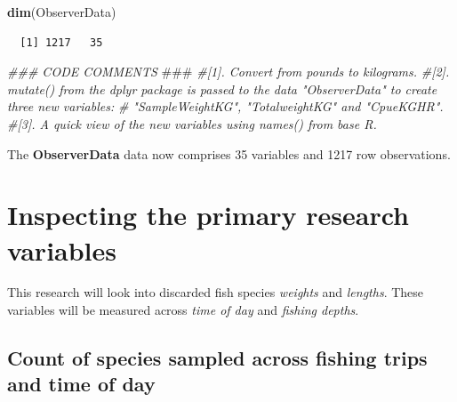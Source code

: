\documentclass[
]{book}
\newenvironment{Shaded}{\begin{snugshade}}{\end{snugshade}}
\newcommand{\AlertTok}[1]{\textcolor[rgb]{0.94,0.16,0.16}{#1}}
\newcommand{\CommentTok}[1]{\textcolor[rgb]{0.56,0.35,0.01}{\textit{#1}}}
\newcommand{\KeywordTok}[1]{\textcolor[rgb]{0.13,0.29,0.53}{\textbf{#1}}}
\newcommand{\NormalTok}[1]{#1}
\begin{document}
\begin{Shaded}
\begin{Highlighting}[]
\KeywordTok{dim}\NormalTok{(ObserverData)}
\end{Highlighting}
\end{Shaded}

\begin{verbatim}
  [1] 1217   35
\end{verbatim}

\begin{Shaded}
\begin{Highlighting}[]
\CommentTok{### CODE COMMENTS }\AlertTok{###}
\CommentTok{#[1]. Convert from pounds to kilograms.}
\CommentTok{#[2]. mutate() from the dplyr package is passed to the data "ObserverData" to create three new variables: }
\CommentTok{#     "SampleWeightKG", "TotalweightKG" and "CpueKGHR".}
\CommentTok{#[3]. A quick view of the new variables using names() from base R.}
\end{Highlighting}
\end{Shaded}

The \textbf{ObserverData} data now comprises 35 variables and 1217 row observations.

\hypertarget{inspecting-the-primary-research-variables}{%
\section{Inspecting the primary research variables}\label{inspecting-the-primary-research-variables}}

This research will look into discarded fish species \emph{weights} and \emph{lengths}. These variables will be measured across \emph{time of day} and \emph{fishing depths}.

\hypertarget{count-of-species-sampled-across-fishing-trips-and-time-of-day}{%
\subsection{Count of species sampled across fishing trips and time of day}\label{count-of-species-sampled-across-fishing-trips-and-time-of-day}}
\end{document}
